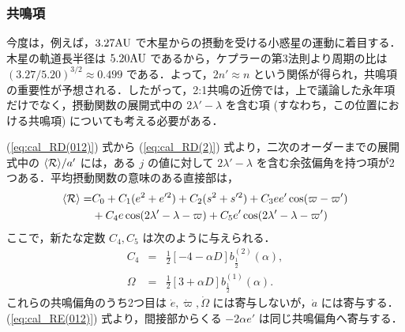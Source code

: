 \documentclass[11pt,a4paper,oneside,onecolumn]{jarticle}
\begin{document}
\subsubsection{共鳴項 \label{sec:resonant}}
今度は，例えば，$3.27{\rm AU}$ で木星からの摂動を受ける小惑星の運動に着目する．木星の軌道長半径は $5.20 {\rm AU}$ であるから，ケプラーの第3法則より周期の比は $(3.27/5.20)^{3/2} \approx 0.499$ である．よって，$2 n' \approx n$ という関係が得られ，共鳴項の重要性が予想される．したがって，2:1共鳴の近傍では，上で議論した永年項だけでなく，摂動関数の展開式中の $2 \lambda' - \lambda$ を含む項 (すなわち，この位置における共鳴項) についても考える必要がある．

(\ref{eq:cal_RD(012)}) 式から (\ref{eq:cal_RD(2)}) 式より，二次のオーダーまでの展開式中の $\langle {\cal R} \rangle / a'$ には，ある $j$ の値に対して $2\lambda' - \lambda$ を含む余弦偏角を持つ項が2つある．平均摂動関数の意味のある直接部は，
\begin{equation}
\begin{split}
\langle {\cal R} \rangle = & C_0 + C_1 (e^2 + e'^2) + C_2 (s^2 + s'^2) + C_3 e e' \cos (\varpi - \varpi') \\
& + C_4 e \cos (2 \lambda' - \lambda - \varpi) + C_5 e' \cos (2 \lambda' - \lambda - \varpi')
\end{split}
\end{equation} 
ここで，新たな定数 $C_4, C_5$ は次のように与えられる．
\begin{eqnarray}
C_4 & = & \frac{1}{2} [- 4 - \alpha D] b_{\frac{1}{2}}^{(2)} (\alpha), \\
\Omega & = & \frac{1}{2} [3 + \alpha D] b_{\frac{1}{2}}^{(1)} (\alpha).
\end{eqnarray}
これらの共鳴偏角のうち2つ目は $\dot{e}, \dot{\varpi}, \dot{\Omega}$ には寄与しないが，$\dot{a}$ には寄与する．(\ref{eq:cal_RE(012)}) 式より，間接部からくる $- 2 \alpha e'$ は同じ共鳴偏角へ寄与する．
\end{document}
